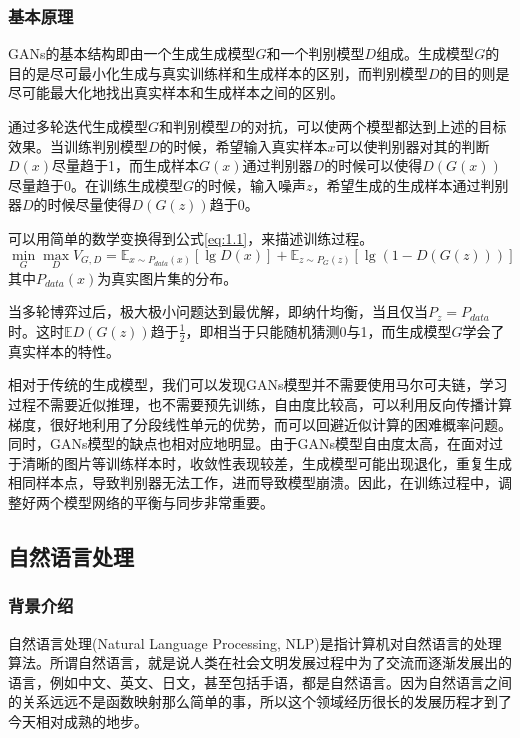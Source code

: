 \subsubsection{基本原理}
GANs的基本结构即由一个生成生成模型$G$和一个判别模型$D$组成。生成模型$G$的目的是尽可最小化生成与真实训练样和生成样本的区别，而判别模型$D$的目的则是尽可能最大化地找出真实样本和生成样本之间的区别。

通过多轮迭代生成模型$G$和判别模型$D$的对抗，可以使两个模型都达到上述的目标效果。当训练判别模型$D$的时候，希望输入真实样本$x$可以使判别器对其的判断$D(x)$尽量趋于1，而生成样本$G(x)$通过判别器$D$的时候可以使得$D(G(x))$尽量趋于0。在训练生成模型$G$的时候，输入噪声$z$，希望生成的生成样本通过判别器$D$的时候尽量使得$D(G(z))$趋于0。

可以用简单的数学变换得到公式\eqref{eq:1.1}，来描述训练过程。
\begin{equation}
    \label{eq:1.1}
    \min_{G}\max_{D} V_{G,D} = \mathbb{E}_{x \sim P_{data}(x)}[\lg D(x)] + \mathbb{E}_{z \sim P_{G}(z)}[\lg (1-D(G(z)))]
\end{equation}
其中$P_{data}(x)$为真实图片集的分布。

当多轮博弈过后，极大极小问题达到最优解，即纳什均衡，当且仅当$P_z = P_{data}$时。这时$\mathbb{E} D(G(z))$趋于$\frac{1}{2}$，即相当于只能随机猜测0与1，而生成模型$G$学会了真实样本的特性。

相对于传统的生成模型，我们可以发现GANs模型并不需要使用马尔可夫链，学习过程不需要近似推理，也不需要预先训练，自由度比较高，可以利用反向传播计算梯度，很好地利用了分段线性单元的优势，而可以回避近似计算的困难概率问题。同时，GANs模型的缺点也相对应地明显。由于GANs模型自由度太高，在面对过于清晰的图片等训练样本时，收敛性表现较差，生成模型可能出现退化，重复生成相同样本点，导致判别器无法工作，进而导致模型崩溃。因此，在训练过程中，调整好两个模型网络的平衡与同步非常重要。

\subsection{自然语言处理}
\subsubsection{背景介绍}
自然语言处理(Natural Language Processing, NLP)是指计算机对自然语言的处理算法。所谓自然语言，就是说人类在社会文明发展过程中为了交流而逐渐发展出的语言，例如中文、英文、日文，甚至包括手语，都是自然语言。因为自然语言之间的关系远远不是函数映射那么简单的事，所以这个领域经历很长的发展历程才到了今天相对成熟的地步。

